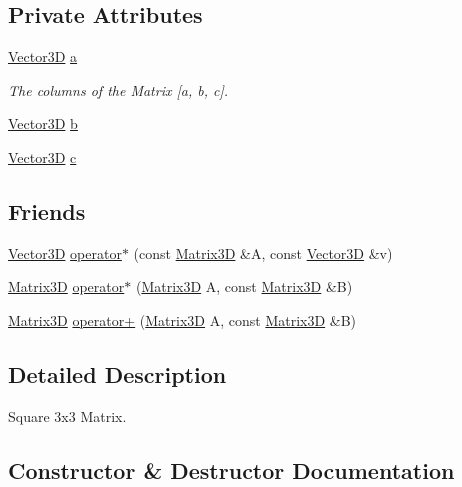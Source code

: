 \subsection*{Private Attributes}
\begin{DoxyCompactItemize}
\item 
\hyperlink{classVector3D}{Vector3D} \hyperlink{classlinalg_1_1Matrix3D_a33667283fe3c4bbac6d4f78eae2af3b6}{a}
\begin{DoxyCompactList}\small\item\em The columns of the Matrix \mbox{[}a, b, c\mbox{]}. \end{DoxyCompactList}\item 
\hyperlink{classVector3D}{Vector3D} \hyperlink{classlinalg_1_1Matrix3D_acf0cd214420329fe18c902be95da0b23}{b}
\item 
\hyperlink{classVector3D}{Vector3D} \hyperlink{classlinalg_1_1Matrix3D_abe82e945bf73f0d0f6f28c1749e2c7e3}{c}
\end{DoxyCompactItemize}
\subsection*{Friends}
\begin{DoxyCompactItemize}
\item 
\hyperlink{classVector3D}{Vector3D} \hyperlink{classlinalg_1_1Matrix3D_a7ae064396881469e4d815cfba5804a2e}{operator$\ast$} (const \hyperlink{classlinalg_1_1Matrix3D}{Matrix3D} \&A, const \hyperlink{classVector3D}{Vector3D} \&v)
\item 
\hyperlink{classlinalg_1_1Matrix3D}{Matrix3D} \hyperlink{classlinalg_1_1Matrix3D_a701c3381ba551de2652b9f021a8454ec}{operator$\ast$} (\hyperlink{classlinalg_1_1Matrix3D}{Matrix3D} A, const \hyperlink{classlinalg_1_1Matrix3D}{Matrix3D} \&B)
\item 
\hyperlink{classlinalg_1_1Matrix3D}{Matrix3D} \hyperlink{classlinalg_1_1Matrix3D_a54929d88410f4beedd5ef7ef3ba8cffc}{operator+} (\hyperlink{classlinalg_1_1Matrix3D}{Matrix3D} A, const \hyperlink{classlinalg_1_1Matrix3D}{Matrix3D} \&B)
\end{DoxyCompactItemize}


\subsection{Detailed Description}
Square 3x3 Matrix. 

\subsection{Constructor \& Destructor Documentation}
